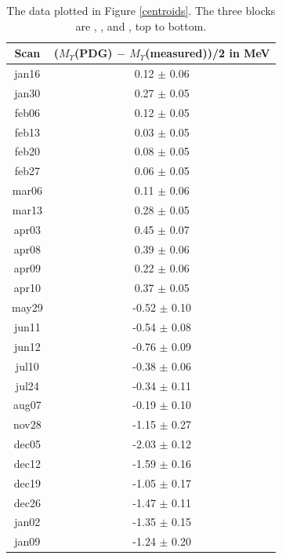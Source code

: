 \documentclass[aps,prd,preprint,superscriptaddress,tightenlines,nofootinbib,floatfix]{revtex4}
\begin{document}
\begin{table}[p]
  \begin{center}
    \renewcommand{\arraystretch}{1.25}
    \begin{tabular}{c | c}
\mbox{\hspace{0.5 cm}} Scan \mbox{\hspace{0.5 cm}} & \mbox{\hspace{0.5 cm}} ($M_\Upsilon$(PDG) $-$ $M_\Upsilon$(measured))/2 in MeV \mbox{\hspace{0.5 cm}} \\\hline
jan16 & 0.12 $\pm$ 0.06 \\
jan30 & 0.27 $\pm$ 0.05 \\
feb06 & 0.12 $\pm$ 0.05 \\
feb13 & 0.03 $\pm$ 0.05 \\
feb20 & 0.08 $\pm$ 0.05 \\
feb27 & 0.06 $\pm$ 0.05 \\
mar06 & 0.11 $\pm$ 0.06 \\
mar13 & 0.28 $\pm$ 0.05 \\
apr03 & 0.45 $\pm$ 0.07 \\
apr08 & 0.39 $\pm$ 0.06 \\
apr09 & 0.22 $\pm$ 0.06 \\
apr10 & 0.37 $\pm$ 0.05 \\\hline
may29 & -0.52 $\pm$ 0.10 \\
jun11 & -0.54 $\pm$ 0.08 \\
jun12 & -0.76 $\pm$ 0.09 \\
jul10 & -0.38 $\pm$ 0.06 \\
jul24 & -0.34 $\pm$ 0.11 \\
aug07 & -0.19 $\pm$ 0.10 \\\hline
nov28 & -1.15 $\pm$ 0.27 \\
dec05 & -2.03 $\pm$ 0.12 \\
dec12 & -1.59 $\pm$ 0.16 \\
dec19 & -1.05 $\pm$ 0.17 \\
dec26 & -1.47 $\pm$ 0.11 \\
jan02 & -1.35 $\pm$ 0.15 \\
jan09 & -1.24 $\pm$ 0.20 \\\hline
    \end{tabular}
  \end{center}
  \caption{\label{centroidstab} The data plotted in Figure
  \ref{centroids}.  The three blocks are \uone, \utwo, and \uthree,
  top to bottom.}
\end{table}
\end{document}
